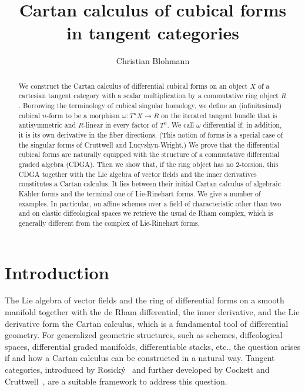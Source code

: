\documentclass[12pt,reqno, a4paper]{amsart}
\numberwithin{equation}{section}
\theoremstyle{plain}
\theoremstyle{definition}
\theoremstyle{remark}
\begin{document}
\title{Cartan calculus of cubical forms\\ in tangent categories}

\author[C.~Blohmann]{Christian Blohmann}
\address{Max-Planck-Institut f\"ur Mathematik, Vivatsgasse 7, 53111 Bonn, Germany}




\begin{abstract}
We construct the Cartan calculus of differential cubical forms on an object $X$ of a cartesian tangent category with a scalar multiplication by a commutative ring object $R$. Borrowing the terminology of cubical singular homology, we define an (infinitesimal) cubical $n$-form to be a morphism $\omega: T^n X \to R$ on the iterated tangent bundle that is antisymmetric and $R$-linear in every factor of $T^n$. We call $\omega$ differential if, in addition, it is its own derivative in the fiber directions. (This notion of forms is a special case of the singular forms of Cruttwell and Lucyshyn-Wright.) We prove that the differential cubical forms are naturally equipped with the structure of a commutative differential graded algebra (CDGA). Then we show that, if the ring object has no $2$-torsion, this CDGA together with the Lie algebra of vector fields and the inner derivatives constitutes a Cartan calculus. It lies between their initial Cartan calculus of algebraic K\"ahler forms and the terminal one of Lie-Rinehart forms. We give a number of examples. In particular, on affine schemes over a field of characteristic other than two and on elastic diffeological spaces we retrieve the usual de Rham complex, which is generally different from the complex of Lie-Rinehart forms.
\end{abstract}

\maketitle

\setcounter{tocdepth}{1}
\tableofcontents%

\section{Introduction}

The Lie algebra of vector fields and the ring of differential forms on a smooth manifold together with the de Rham differential, the inner derivative, and the Lie derivative form the Cartan calculus, which is a fundamental tool of differential geometry. For generalized geometric structures, such as schemes, diffeological spaces, differential graded manifolds, differentiable stacks, etc., the question arises if and how a Cartan calculus can be constructed in a natural way. Tangent categories, introduced by Rosick\'y~\cite{Rosicky:1984} and further developed by Cockett and Cruttwell~\cite{CockettCruttwell:2014}, are a suitable framework to address this question.
\end{document}
